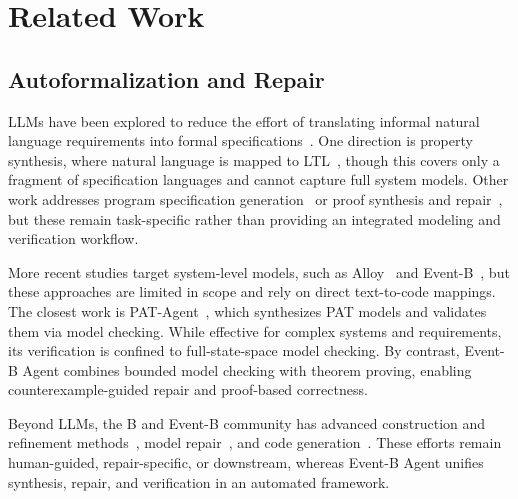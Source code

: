 \section{Related Work}

\subsection{Autoformalization and Repair}

LLMs have been explored to reduce the effort of translating informal natural language requirements into formal specifications~\cite{zhang2025position}.
One direction is property synthesis, where natural language is mapped to LTL~\cite{cosler2023nl2spec, fuggitti2023nl2ltl}, though this covers only a fragment of specification languages and cannot capture full system models.
Other work addresses program specification generation~\cite{wen2024enchanting, wu2023lemur} or proof synthesis and repair~\cite{first2023baldur, lu2024proof, carrott2024coqpyt}, but these remain task-specific rather than providing an integrated modeling and verification workflow.

More recent studies target system-level models, such as Alloy~\cite{hong2025effectiveness} and Event-B~\cite{capozucca2025ai}, but these approaches are limited in scope and rely on direct text-to-code mappings.
The closest work is PAT-Agent~\cite{zuo2025pat}, which synthesizes PAT models and validates them via model checking.
While effective for complex systems and requirements, its verification is confined to full-state-space model checking.
By contrast, Event-B Agent combines bounded model checking with theorem proving, enabling counterexample-guided repair and proof-based correctness.

Beyond LLMs, the B and Event-B community has advanced construction and refinement methods~\cite{alkhammash2015building,dupont2021event,mashkoor2017refinement}, model repair~\cite{cai2019automatic,cai2022fast,kobayashi2024repairing}, and code generation~\cite{mery2011automatic,furst2014code,rivera2017code}.
These efforts remain human-guided, repair-specific, or downstream, whereas Event-B Agent unifies synthesis, repair, and verification in an automated framework.

